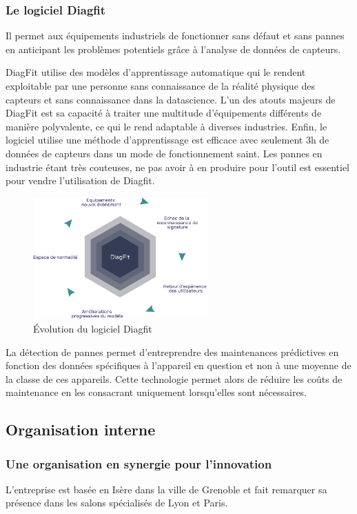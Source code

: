 \subsubsection{Le logiciel Diagfit}
Il permet aux équipements industriels de fonctionner sans défaut et sans pannes en anticipant les problèmes potentiels grâce à l'analyse de données de capteurs.

DiagFit utilise des modèles d'apprentissage automatique qui le rendent exploitable par une personne sans connaissance de la réalité physique des capteurs et sans connaissance dans la datascience.
L'un des atouts majeurs de DiagFit est sa capacité à traiter une multitude d'équipements différents de manière polyvalente, ce qui le rend adaptable à diverses industries.
Enfin, le logiciel utilise une méthode d'apprentissage est efficace avec seulement 3h de données de capteurs dans un mode de fonctionnement saint.
Les pannes en industrie étant très couteuses, ne pas avoir à en produire pour l'outil est essentiel pour vendre l'utilisation de Diagfit.

\begin{figure}[ht!]
    \centering
    \includegraphics[width=0.6\textwidth]{paper/figures/diagfit.pdf}
    \caption{Évolution du logiciel Diagfit}
    \label{fig:diagfit}
\end{figure}

La détection de pannes permet d'entreprendre des maintenances prédictives en fonction des données spécifiques à l'appareil en question et non à une moyenne de la classe de ces appareils.
Cette technologie permet alors de réduire les coûts de maintenance en les consacrant uniquement lorsqu'elles sont nécessaires.

\subsection{Organisation interne}
\subsubsection{Une organisation en synergie pour l'innovation}
L'entreprise est basée en Isère dans la ville de Grenoble et fait remarquer sa présence dans les salons spécialisés de Lyon et Paris.

